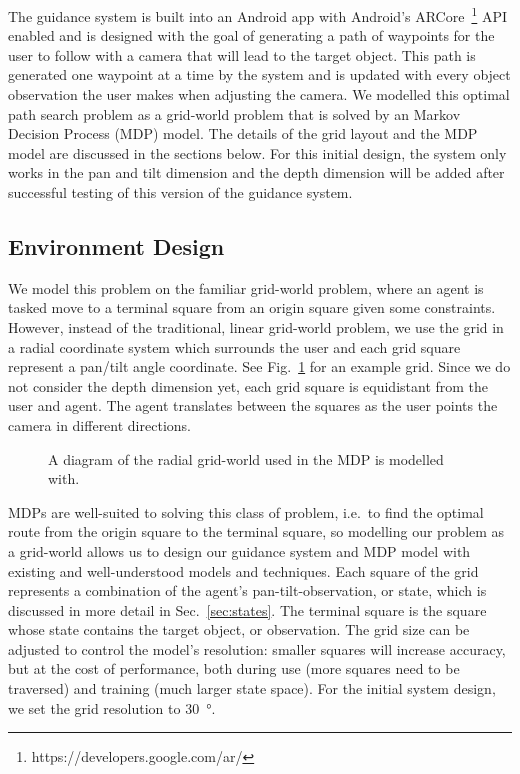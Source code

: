 \documentclass[a4paper, twoside]{article}
\begin{document}
\noindent The guidance system is built into an Android app with Android's ARCore~\footnote{https://developers.google.com/ar/} API enabled and is designed with the goal of generating a path of waypoints for the user to follow with a camera that will lead to the target object. This path is generated one waypoint at a time by the system and is updated with every object observation the user makes when adjusting the camera. We modelled this optimal path search problem as a grid-world problem that is solved by an Markov Decision Process (MDP) model. The details of the grid layout and the MDP model are discussed in the sections below. For this initial design, the system only works in the pan and tilt dimension and the depth dimension will be added after successful testing of this version of the guidance system.

\subsection{Environment Design}\label{sec:env-design}

\noindent We model this problem on the familiar grid-world problem, where an agent is tasked move to a terminal square from an origin square given some constraints. However, instead of the traditional, linear grid-world problem, we use the grid in a radial coordinate system which surrounds the user and each grid square represent a pan/tilt angle coordinate. See Fig.~\ref{fig:environment} for an example grid. Since we do not consider the depth dimension yet, each grid square is equidistant from the user and agent. The agent translates between the squares as the user points the camera in different directions.

\begin{figure}  
  \centering
  
\caption{A diagram of the radial grid-world used in the MDP is modelled with. }\label{fig:environment}
\end{figure}

MDPs are well-suited to solving this class of problem, i.e.\ to find the optimal route from the origin square to the terminal square, so modelling our problem as a grid-world allows us to design our guidance system and MDP model with existing and well-understood models and techniques. Each square of the grid represents a combination of the agent's pan-tilt-observation, or state, which is discussed in more detail in Sec.~\ref{sec:states}. The terminal square is the square whose state contains the target object, or observation. The grid size can be adjusted to control the model's resolution: smaller squares will increase accuracy, but at the cost of performance, both during use (more squares need to be traversed) and training (much larger state space). For the initial system design, we set the grid resolution to \SI{30}{\degree}.
\end{document}
